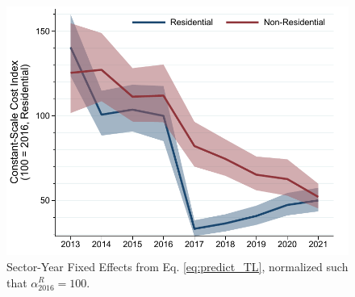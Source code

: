 \documentclass[preprint,12pt,authoryear]{elsarticle}
\begin{document}
\begin{figure}[t]
\includegraphics[width=\textwidth]{graphs/CA_SGIP/CSCI_TL.pdf}
\caption{Sector-Year Fixed Effects from Eq. \ref{eq:predict_TL}, normalized such that $\alpha^{R}_{2016} = 100$.}\label{fig:CSCI_TL}
\end{figure}
\end{document}
